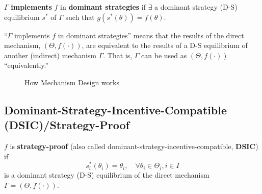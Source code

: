 \documentclass[11pt]{elegantbook}
\begin{document}
\begin{definition}
    \normalfont
    $\Gamma$ \textbf{implements} $f$ in \textbf{dominant strategies} if $\exists$ a dominant strategy (D-S) equilibrium $s^*$ of $\Gamma$ such that $g(s^*(\theta))=f(\theta)$.
\end{definition}
``$\Gamma$ implements $f$ in dominant strategies'' means that the results of the direct mechanism, $(\Theta,f(\cdot))$, are equivalent to the results of a D-S equilibrium of another (indirect) mechanism $\Gamma$. That is, $\Gamma$ can be used as $(\Theta,f(\cdot))$ ``equivalently.''
\begin{center}\begin{figure}[htbp]
    \centering
    \caption{How Mechanism Design works}
    \label{}
\end{figure}\end{center}




\subsection{Dominant-Strategy-Incentive-Compatible (DSIC)/Strategy-Proof}
\begin{definition}
    \normalfont
    $f$ is \textbf{strategy-proof} (also called dominant-strategy-incentive-compatible, \textbf{DSIC}) if $$s^*_i(\theta_i)=\theta_i,\quad \forall \theta_i\in\Theta_i,i\in I$$ is a dominant strategy (D-S) equilibrium of the direct mechanism $\Gamma=(\Theta,f(\cdot))$.
\end{definition}
\end{document}
